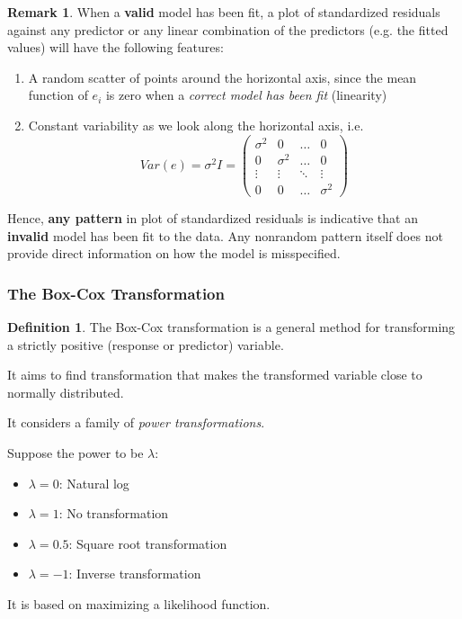 \documentclass[11pt]{article}
\newenvironment{indentone}{\begin{adjustwidth}{3em}{0em}}{\end{adjustwidth}}
\theoremstyle{definition}
\newtheorem{definition}{Definition}[section]
\newtheorem{remark}{Remark}[section]
\numberwithin{equation}{section}
\begin{document}
\begin{remark}
  When a \textbf{valid} model has been fit, a plot of standardized residuals against any predictor or any linear combination of the predictors (e.g. the fitted values) will have the following features:
\begin{enumerate}
  \item A random scatter of points around the horizontal axis, since the mean function of $e_i$ is zero when a \textit{correct model has been fit} (linearity)
  \item Constant variability as we look along the horizontal axis, i.e.
  \begin{equation}
    Var(e)=\sigma^2 I=\begin{pmatrix}\sigma^2&0&\dots&0\\
    0 &\sigma^2&\dots&0\\
    \vdots&\vdots&\ddots&\vdots\\
    0&0&\dots&\sigma^2
    \end{pmatrix}
  \end{equation}

\end{enumerate}
Hence, \textbf{any pattern} in plot of standardized residuals is indicative that an \textbf{invalid} model has been fit to the data. Any nonrandom pattern itself does not provide direct information on how the model is misspecified.
\end{remark}

\subsubsection{The Box-Cox Transformation}

\begin{definition}
The Box-Cox transformation is a general method for transforming a strictly positive (response or predictor) variable.
\end{definition}
\begin{writenotes}
 It aims to find transformation that makes the transformed variable close to normally distributed.

 It considers a family of \textit{power transformations}.

\begin{indentone}Suppose the power to be $\lambda$:
 \begin{itemize}

   \item $\lambda=0$: Natural log

   \item $\lambda=1$: No transformation

   \item $\lambda=0.5$: Square root transformation

   \item $\lambda=-1$: Inverse transformation
 \end{itemize}
\end{indentone}
 It is based on maximizing a likelihood function.
\end{writenotes}
\end{document}
